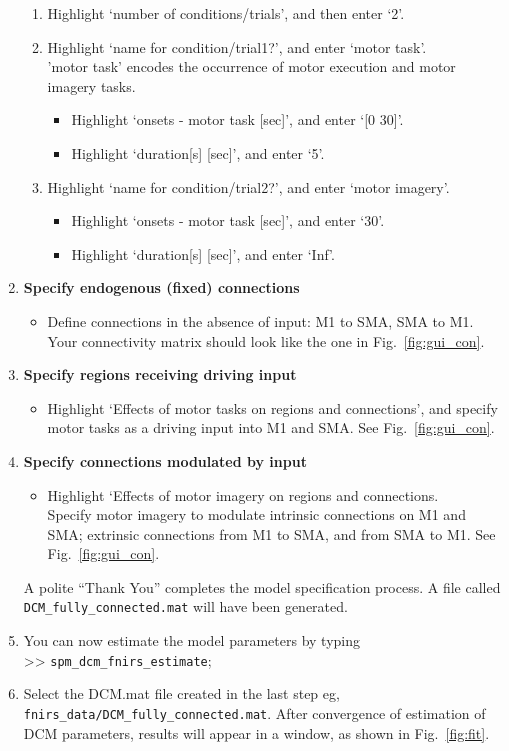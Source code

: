 \begin{enumerate}
\begin{enumerate}
\item Highlight `number of conditions/trials', and then enter `2'. 
\item Highlight `name for condition/trial1?', and enter `motor task'. \\'motor task' encodes the occurrence of motor execution and motor imagery tasks. 
\begin{itemize}
\item Highlight `onsets - motor task [sec]', and enter `[0 30]'. 
\item Highlight `duration[s] [sec]', and enter `5'. 
\end{itemize}
\item Highlight `name for condition/trial2?', and enter `motor imagery'. 
\begin{itemize}
\item Highlight `onsets - motor task [sec]', and enter `30'. 
\item Highlight `duration[s] [sec]', and enter `Inf'. 
\end{itemize}
\end{enumerate}
\item \textbf{Specify endogenous (fixed) connections}
\begin{itemize}
\item Define connections in the absence of input: M1 to SMA, SMA to M1. \\Your connectivity matrix should look like the one in Fig.~\ref{fig:gui_con}.
\end{itemize}
\item \textbf{Specify regions receiving driving input}
\begin{itemize}
\item Highlight `Effects of motor tasks on regions and connections', and specify motor tasks as a driving input into M1 and SMA. See Fig.~\ref{fig:gui_con}.
\end{itemize}
\item \textbf{Specify connections modulated by input}
\begin{itemize}
\item Highlight `Effects of motor imagery on regions and connections. \\Specify motor imagery to modulate intrinsic connections on M1 and SMA; extrinsic connections from M1 to SMA, and from SMA to M1. See Fig.~\ref{fig:gui_con}. 
\end{itemize}
A polite ``Thank You'' completes the model specification process. A file called \texttt{DCM\_fully\_connected.mat} will have been generated. 
\item You can now estimate the model parameters by typing \\
>> \texttt{spm\_dcm\_fnirs\_estimate};
\item Select the DCM.mat file created in the last step eg, \texttt{fnirs\_data/DCM\_fully\_connected.mat}. After convergence of estimation of DCM parameters, results will appear in a window, as shown in Fig.~\ref{fig:fit}. 


\end{enumerate}
